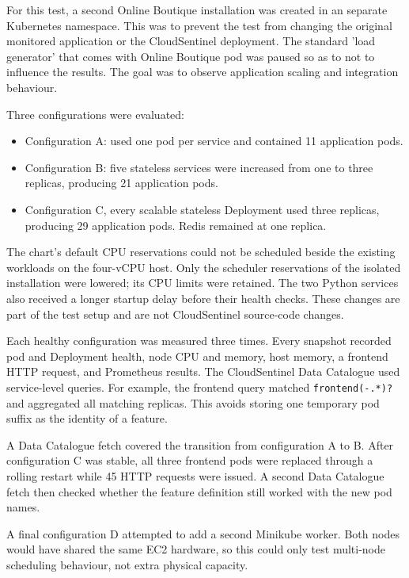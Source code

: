 For this test, a second Online Boutique installation was created in an separate Kubernetes namespace. This was to prevent the test from changing the original monitored application or the CloudSentinel deployment. The standard 'load generator' that comes with Online Boutique pod was paused so as to not to influence the results. The goal was to observe application scaling and integration behaviour.

Three configurations were evaluated:

\begin{itemize}
    \item Configuration A: used one pod per service and contained 11 application pods.
    \item Configuration B: five stateless services were increased from one to three replicas, producing 21 application pods.
    \item Configuration C, every scalable stateless Deployment used three replicas, producing 29 application pods. Redis remained at one replica.
\end{itemize}

The chart's default CPU reservations could not be scheduled beside the existing workloads on the four-vCPU host. Only the scheduler reservations of the isolated installation were lowered; its CPU limits were retained. The two Python services also received a longer startup delay before their health checks. These changes are part of the test setup and are not CloudSentinel source-code changes.

Each healthy configuration was measured three times. Every snapshot recorded pod and Deployment health, node CPU and memory, host memory, a frontend HTTP request, and Prometheus results. The CloudSentinel Data Catalogue used service-level queries. For example, the frontend query matched \texttt{frontend(-.*)?} and aggregated all matching replicas. This avoids storing one temporary pod suffix as the identity of a feature.

A Data Catalogue fetch covered the transition from configuration A to B. After configuration C was stable, all three frontend pods were replaced through a rolling restart while 45 HTTP requests were issued. A second Data Catalogue fetch then checked whether the feature definition still worked with the new pod names.

A final configuration D attempted to add a second Minikube worker. Both nodes would have shared the same EC2 hardware, so this could only test multi-node scheduling behaviour, not extra physical capacity.

